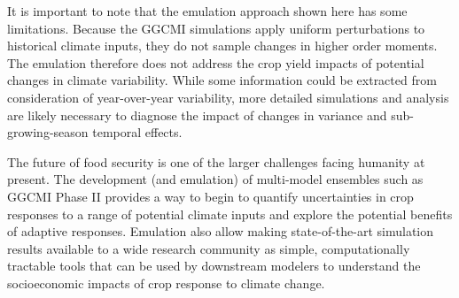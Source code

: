 \documentclass[preprint, 5p, times, twocolumn]{elsarticle}
\begin{document}
It is important to note that the emulation approach shown here has some limitations. Because the GGCMI simulations apply uniform perturbations to historical climate inputs, they do not sample changes in higher order moments. The emulation therefore does not address the crop yield impacts of potential changes in climate variability. While some information could be extracted from consideration of year-over-year variability, more detailed simulations and analysis are likely necessary to diagnose the impact of changes in variance and sub-growing-season temporal effects. 

The future of food security is one of the larger challenges facing humanity at present. The development (and emulation) of multi-model ensembles such as GGCMI Phase II provides a way to begin to quantify uncertainties in crop responses to a range of potential climate inputs and explore the potential benefits of adaptive responses. Emulation also allow making state-of-the-art simulation results available to a wide research community as simple, computationally tractable tools that can be used by downstream modelers to understand the socioeconomic impacts of crop response to climate change. 


\end{document}
